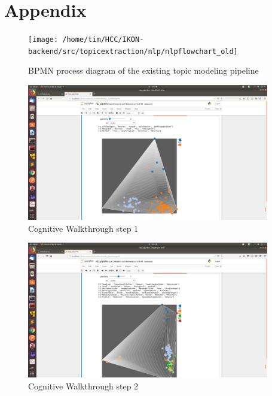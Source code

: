 %

\chapter{Appendix}
\label{ch:Appendix}

\begin{figure}[t]
	\centering
	\texttt{[image: /home/tim/HCC/IKON-backend/src/topicextraction/nlp/nlpflowchart\_old]}
	\caption{\label{pic:IKON_pipeline} BPMN process diagram of the existing topic modeling pipeline}
\end{figure}

\begin{figure}[t]
	\centering
	\includegraphics[width=400px]{../chapters/validation/pics/1}
	\caption{\label{pic:step1} Cognitive Walkthrough step 1}
\end{figure}

\begin{figure}[t]
	\centering
	\includegraphics[width=400px]{../chapters/validation/pics/2}
	\caption{\label{pic:step2} Cognitive Walkthrough step 2}
\end{figure}

